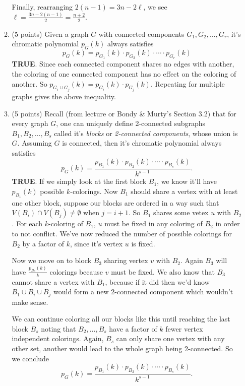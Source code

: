 \documentclass[11pt]{article}
\newcommand{\n}{\vspace{0.2cm}}
\begin{document}
\begin{enumerate}
\begin{enumerate}
          Finally, rearranging \(2(n-1) = 3n-2\ell\), we see \(\ell = \frac{3n - 2(n-1)}{2} = \frac{n+2}{2}\). \n

        \item (5 points) Given a graph \(G\) with connected components \(G_1,G_2,\hdots,G_r\), it's chromatic polynomial \(p_G(k)\) always satisfies
          \[p_G(k) = p_{G_1}(k) \cdot p_{G_2}(k) \cdot \cdots \cdot p_{G_r}(k)\]
          \textbf{TRUE}.  Since each connected component shares no edges with another, the coloring of one connected component has no effect on the coloring of another.  So \(p_{G_i \sqcup G_j}(k) = p_{G_i}(k) \cdot p_{G_j}(k)\).  Repeating for multiple graphs gives the above inequality. \n

        \item (5 points) Recall (from lecture or Bondy \& Murty’s Section 3.2) that for every graph \(G\), one can uniquely define 2-connected subgraphs \(B_1,B_2,\hdots,B_s\) called it's \textit{blocks} or \textit{2-connected components}, whose union is \(G\).  Assuming \(G\) is connected, then it's chromatic polynomial always satisfies
          \[p_G(k) = \frac{p_{B_1}(k) \cdot p_{B_2}(k) \cdot \cdots \cdot p_{B_s}(k)}{k^{s-1}}.\]
          \textbf{TRUE}.  If we simply look at the first block \(B_1\), we know it'll have \(p_{B_1}(k)\) possible \(k\)-colorings.  Now \(B_1\) should share a vertex with at least one other block, suppose our blocks are ordered in a way such that \(V(B_i) \cap V(B_j) \neq \emptyset \text{ when } j = i+1\).  So \(B_1\) shares some vetex \(u\) with \(B_2\).  For each \(k\)-coloring of \(B_1\), \(u\) must be fixed in any coloring of \(B_2\) in order to not conflict.  We've now reduced the number of possible colorings for \(B_2\) by a factor of \(k\), since it's vertex \(u\) is fixed. \n

           Now we move on to block \(B_3\) sharing vertex \(v\) with \(B_2\).  Again \(B_3\) will have \(\frac{p_{B_3}(k)}{k}\) colorings because \(v\) must be fixed.  We also know that \(B_3\) cannot share a vertex with \(B_1\), because if it did then we'd know \(B_1 \cup B_i \cup B_j\) would form a new 2-connected component which wouldn't make sense. \n

          We can continue coloring all our blocks like this until reaching the last block \(B_s\) noting that \(B_2, \hdots, B_s\) have a factor of \(k\) fewer vertex independent colorings.  Again, \(B_s\) can only share one vertex with any other set, another would lead to the whole graph being 2-connected.  So we conclude
          \[p_G(k) = \frac{p_{B_1}(k) \cdot p_{B_2}(k) \cdot \cdots \cdot p_{B_s}(k)}{k^{s-1}}.\]
      \end{enumerate} \n


\end{enumerate}
\end{document}
